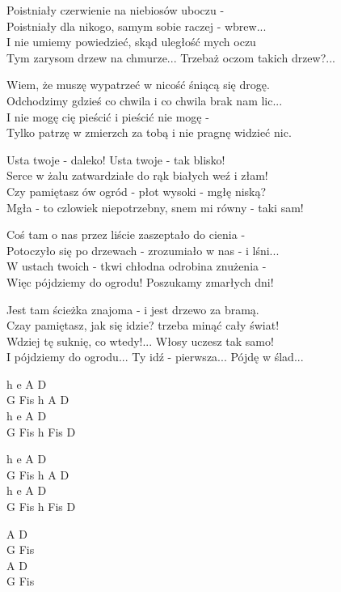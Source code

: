 \begin{text}
    \begin{smallTwo}
    Poistniały czerwienie na niebiosów uboczu -\\
    Poistniały dla nikogo, samym sobie raczej - wbrew...\\
    I nie umiemy powiedzieć, skąd uległość mych oczu\\
    Tym zarysom drzew na chmurze... Trzebaż oczom takich drzew?...

    Wiem, że muszę wypatrzeć w nicość śniącą się drogę.\\
    Odchodzimy gdzieś co chwila i co chwila brak nam lic...\\
    I nie mogę cię pieścić i pieścić nie mogę -\\
    Tylko patrzę w zmierzch za tobą i nie pragnę widzieć nic.

    \vin Usta twoje - daleko! Usta twoje - tak blisko!\\
    \vin Serce w żalu zatwardziałe do rąk białych weź i złam!\\
    \vin Czy pamiętasz ów ogród - płot wysoki - mgłę niską?\\
    \vin Mgła - to czlowiek niepotrzebny, snem mi równy - taki sam!

    Coś tam o nas przez liście zaszeptało do cienia -\\
    Potoczyło się po drzewach - zrozumiało w nas - i lśni...\\
    W ustach twoich - tkwi chłodna odrobina znużenia -\\
    Więc pójdziemy do ogrodu! Poszukamy zmarłych dni!

    Jest tam ścieżka znajoma - i jest drzewo za bramą.\\
    Czay pamiętasz, jak się idzie? trzeba minąć cały świat!\\
    Wdziej tę suknię, co wtedy!... Włosy uczesz tak samo!\\
    I pójdziemy do ogrodu... Ty idź - pierwsza... Pójdę w ślad...
\end{smallTwo}
\end{text}
\begin{chord}
    \begin{smallTwo}
    h e A D\\
    G Fis h A D\\
    h e A D\\
    G Fis h Fis D

    h e A D\\
    G Fis h A D\\
    h e A D\\
    G Fis h Fis D

    A D\\
    G Fis\\
    A D\\
    G Fis
\end{smallTwo}
\end{chord}